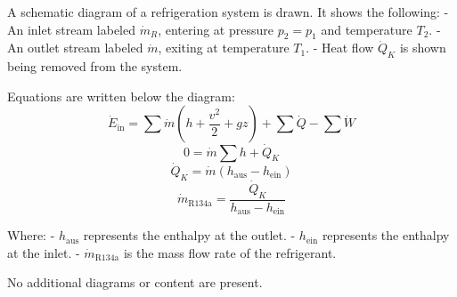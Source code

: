 A schematic diagram of a refrigeration system is drawn. It shows the following:  
- An inlet stream labeled \( \dot{m}_R \), entering at pressure \( p_2 = p_1 \) and temperature \( T_2 \).  
- An outlet stream labeled \( \dot{m} \), exiting at temperature \( T_1 \).  
- Heat flow \( \dot{Q}_K \) is shown being removed from the system.  

Equations are written below the diagram:  
\[
\dot{E}_{\text{in}} = \sum \dot{m} \left( h + \frac{v^2}{2} + gz \right) + \sum \dot{Q} - \sum \dot{W}
\]  
\[
0 = \dot{m} \sum h + \dot{Q}_K
\]  
\[
\dot{Q}_K = \dot{m} \left( h_{\text{aus}} - h_{\text{ein}} \right)
\]  
\[
\dot{m}_{\text{R134a}} = \frac{\dot{Q}_K}{h_{\text{aus}} - h_{\text{ein}}}
\]  

Where:  
- \( h_{\text{aus}} \) represents the enthalpy at the outlet.  
- \( h_{\text{ein}} \) represents the enthalpy at the inlet.  
- \( \dot{m}_{\text{R134a}} \) is the mass flow rate of the refrigerant.  

No additional diagrams or content are present.